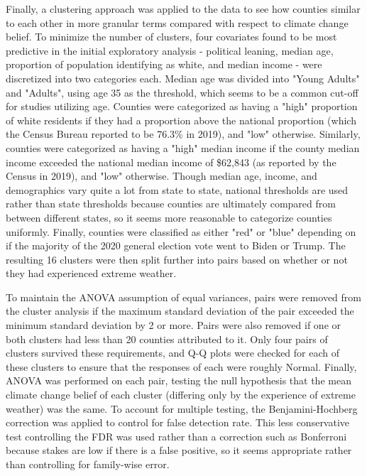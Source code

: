 \documentclass{article}
\begin{document}
Finally, a clustering approach was applied to the data to see how counties similar to each other in more granular terms compared with respect to climate change belief. To minimize the number of clusters, four covariates found to be most predictive in the initial exploratory analysis - political leaning, median age, proportion of population identifying as white, and median income - were discretized into two categories each. Median age was divided into "Young Adults" and "Adults", using age 35 as the threshold, which seems to be a common cut-off for studies utilizing age. Counties were categorized as having a "high" proportion of white residents if they had a proportion above the national proportion (which the Census Bureau reported to be 76.3\% in 2019),  and "low" otherwise. Similarly, counties were categorized as having a "high" median income if the county median income exceeded the national median income of \$62,843 (as reported by the Census in 2019), and "low" otherwise. Though median age, income, and demographics vary quite a lot from state to state, national thresholds are used rather than state thresholds because counties are ultimately compared from between different states, so it seems more reasonable to categorize counties uniformly. Finally, counties were classified as either "red" or "blue" depending on if the majority of the 2020 general election vote went to Biden or Trump. The resulting 16 clusters were then split further into pairs based on whether or not they had experienced extreme weather.

To maintain the ANOVA assumption of equal variances, pairs were removed from the cluster analysis if the maximum standard deviation of the pair exceeded the minimum standard deviation by 2 or more. Pairs were also removed if one or both clusters had less than 20 counties attributed to it. Only four pairs of clusters survived these requirements, and Q-Q plots were checked for each of these clusters to ensure that the responses of each were roughly Normal. Finally, ANOVA was performed on each pair, testing the null hypothesis that the mean climate change belief of each cluster (differing only by the experience of extreme weather) was the same. To account for multiple testing, the Benjamini-Hochberg correction was applied to control for false detection rate. This less conservative test controlling the FDR was used rather than a correction such as Bonferroni because stakes are low if there is a false positive, so it seems appropriate rather than controlling for family-wise error.
\end{document}
